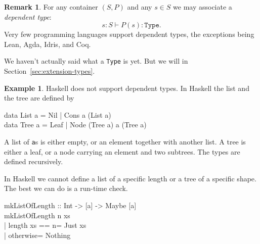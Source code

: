 \documentclass[11pt, a4paper]{article}
\theoremstyle{definition}
\newtheorem{example}[definition]{Example}
\newtheorem{remark}[definition]{Remark}
\theoremstyle{plain}
\begin{document}
\noindent\colorbox{blue!10}{\parbox{\dimexpr\linewidth-2\fboxsep}{%
\begin{remark}\label{rem:dependent-types}
For any container $(S, P)$ and any $s \in S$ we may associate a
\emph{dependent type}:
\[
  s : S \vdash P(s) : \texttt{Type}.
\]
Very few programming languages support dependent types, the exceptions
being Lean, Agda, Idris, and Coq.

We haven't actually said what a \texttt{Type} is yet.  But we will
in Section~\ref{sec:extension-types}.
\end{remark}%
}}

\begin{example}\label{ex:haskell}
Haskell does not support dependent types.  In Haskell the list
and the tree are defined by
\begin{center}
\colorbox{gray!15}{\begin{minipage}{0.85\linewidth}
\ttfamily
data List a = Nil | Cons a (List a)\\
data Tree a = Leaf | Node (Tree a) a (Tree a)
\end{minipage}}
\end{center}
A list of \texttt{a}s is either empty, or an element together with
another list.  A tree is either a leaf, or a node carrying an
element and two subtrees.  The types are defined recursively.

In Haskell we cannot define a
list of a specific length or a tree of a specific shape.  The best
we can do is a run-time check.
\begin{center}
\colorbox{gray!15}{\begin{minipage}{0.75\linewidth}
\ttfamily
mkListOfLength :: Int -> [a] -> Maybe [a]\\
mkListOfLength n xs\\
\hspace*{1.5em}| length xs == n\hspace*{0.5em}= Just xs\\
\hspace*{1.5em}| otherwise\hspace*{3.5em}= Nothing
\end{minipage}}
\end{center}
\end{example}
\end{document}
